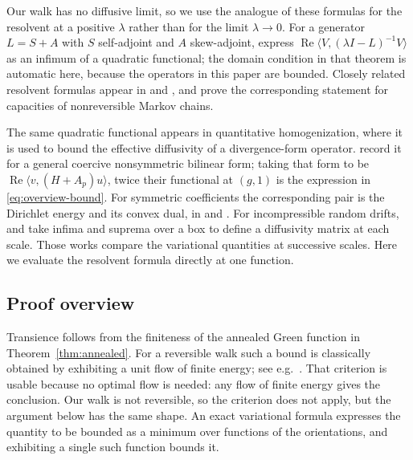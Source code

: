 \documentclass[11pt]{amsart}
\theoremstyle{plain}
\theoremstyle{definition}
\newcommand{\1}{\mathbf 1}
\newcommand{\ip}[2]{\langle #1,#2\rangle}
\begin{document}
Our walk has no diffusive limit, so we use the analogue of these formulas
for the resolvent at a positive $\lambda$ rather than for the limit
$\lambda\to0$.  For a generator $L=S+A$ with $S$ self-adjoint and $A$
skew-adjoint, \citet*[Theorem~4.1]{KLO12} express
$\operatorname{Re}\ip V{(\lambda I-L)^{-1}V}$ as an infimum of a quadratic
functional; the domain condition in that theorem is automatic here, because
the operators in this paper are bounded.  Closely related resolvent formulas
appear in \citet*[(2.17)]{LQSY04} and \citet*[(39)]{Tot18}, and
\citet*[Theorem~2.4 and Section~2.3]{GL14} prove the corresponding statement
for capacities of nonreversible Markov chains.

The same quadratic functional appears in quantitative homogenization, where
it is used to bound the effective diffusivity of a divergence-form operator.
\citet*[Exercise~10.1, immediately before (10.13)]{AKM19} record it for a
general coercive nonsymmetric bilinear form; taking that form to be
$\operatorname{Re}\ip v{(H+A_p)u}$, twice their functional at $(g,1)$ is the
expression in \eqref{eq:overview-bound}.  For symmetric coefficients
the corresponding pair is the Dirichlet energy and its convex dual, in
\citet*[(2.1)--(2.2)]{AS16} and \citet*[(2.6)--(2.9)]{AKM19}.  For
incompressible random drifts, \citet*[(2.4)--(2.5)]{ABK24} and
\citet*[(2.32)--(2.37)]{ABK26} take infima and suprema over a box to define a
diffusivity matrix at each scale.  Those works compare the variational quantities at
successive scales.  Here we evaluate the resolvent formula directly at one
function.

\subsection{Proof overview}\label{ssec:proof-overview}

Transience follows from the finiteness of the annealed Green function in
Theorem~\ref{thm:annealed}.  For a reversible walk such a bound is classically
obtained by exhibiting a unit flow of finite energy; see
e.g.\ \citet*[Theorem~2.11]{LP16}.  That criterion is usable because no
optimal flow is needed: any flow of finite energy gives the conclusion.  Our
walk is not reversible, so the criterion does not apply, but the argument
below has the same shape.  An exact variational
formula expresses the quantity to be bounded as a minimum over functions of
the orientations, and exhibiting a single such function bounds it.
\end{document}
